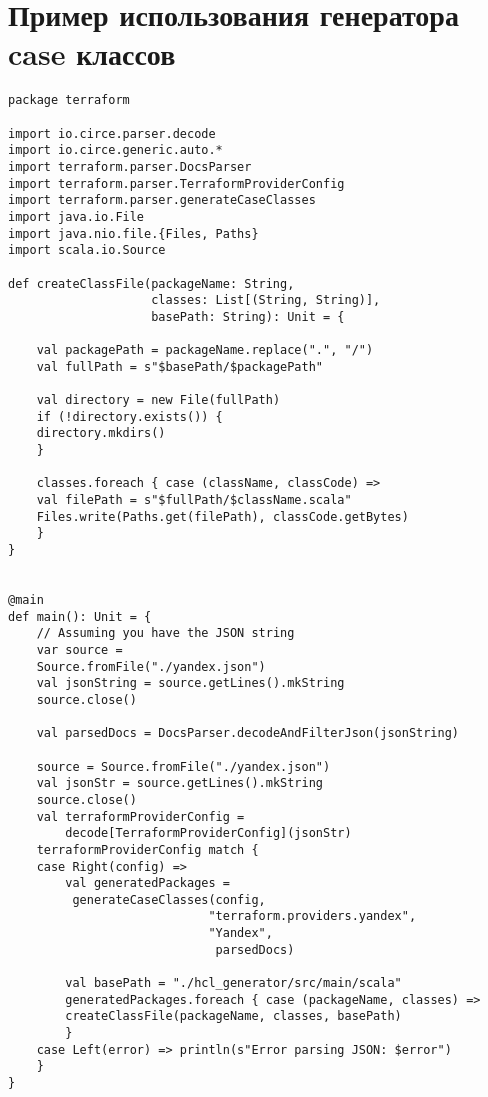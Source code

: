 ﻿\chapter{Пример использования генератора case классов}\label{sec:appendix5}

\begin{verbatim}
package terraform

import io.circe.parser.decode
import io.circe.generic.auto.*
import terraform.parser.DocsParser
import terraform.parser.TerraformProviderConfig
import terraform.parser.generateCaseClasses
import java.io.File
import java.nio.file.{Files, Paths}
import scala.io.Source

def createClassFile(packageName: String,
                    classes: List[(String, String)],
                    basePath: String): Unit = {

    val packagePath = packageName.replace(".", "/")
    val fullPath = s"$basePath/$packagePath"

    val directory = new File(fullPath)
    if (!directory.exists()) {
    directory.mkdirs()
    }

    classes.foreach { case (className, classCode) =>
    val filePath = s"$fullPath/$className.scala"
    Files.write(Paths.get(filePath), classCode.getBytes)
    }
}


@main
def main(): Unit = {
    // Assuming you have the JSON string
    var source = 
    Source.fromFile("./yandex.json")
    val jsonString = source.getLines().mkString
    source.close()

    val parsedDocs = DocsParser.decodeAndFilterJson(jsonString)

    source = Source.fromFile("./yandex.json")
    val jsonStr = source.getLines().mkString
    source.close()
    val terraformProviderConfig = 
        decode[TerraformProviderConfig](jsonStr)
    terraformProviderConfig match {
    case Right(config) =>
        val generatedPackages =
         generateCaseClasses(config,
                            "terraform.providers.yandex",
                            "Yandex",
                             parsedDocs)

        val basePath = "./hcl_generator/src/main/scala"
        generatedPackages.foreach { case (packageName, classes) =>
        createClassFile(packageName, classes, basePath)
        }
    case Left(error) => println(s"Error parsing JSON: $error")
    }
}
\end{verbatim}

